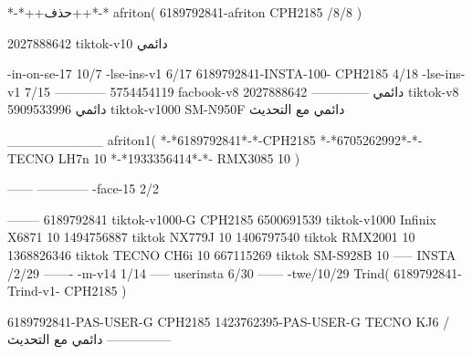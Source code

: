 *-*++حذف++*-*
afriton(
6189792841-afriton CPH2185  /8/8
)

2027888642 tiktok-v10
دائمي

-in-on-se-17 10/7
-lse-ins-v1 6/17
6189792841-INSTA-100- CPH2185 4/18
-lse-ins-v1 7/15
------------
5754454119 facbook-v8
دائمي
--------------
2027888642 tiktok-v8
دائمي
5909533996 tiktok-v1000  SM-N950F
دائمي مع التحديث

__________
afriton1(
*-*6189792841*-*-CPH2185
*-*6705262992*-*- TECNO LH7n 10
*-*1933356414*-*- RMX3085 10
)


------
------------
-face-15 2/2

--------
6189792841 tiktok-v1000-G CPH2185 
6500691539 tiktok-v1000    Infinix X6871 10
1494756887 tiktok    NX779J 10
1406797540 tiktok    RMX2001 10
1368826346 tiktok  TECNO CH6i 10
667115269 tiktok  SM-S928B 10
-----
 INSTA /2/29
-------
-m-v14 1/14
-----
userinsta 6/30
------
-twe/10/29
Trind(
6189792841-Trind-v1- CPH2185 
)


6189792841-PAS-USER-G CPH2185 
1423762395-PAS-USER-G TECNO KJ6  /دائمي مع التحديث
    ---------------
